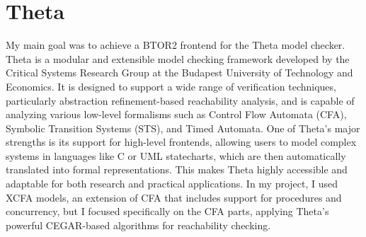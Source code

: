 \section{Theta}
My main goal was to achieve a BTOR2 frontend for the Theta model checker.
Theta is a modular and extensible model checking framework developed by the Critical Systems Research Group at the Budapest University of Technology and Economics. It is designed to support a wide range of verification techniques, particularly abstraction refinement-based reachability analysis, and is capable of analyzing various low-level formalisms such as Control Flow Automata (CFA), Symbolic Transition Systems (STS), and Timed Automata.
One of Theta's major strengths is its support for high-level frontends, allowing users to model complex systems in languages like C or UML statecharts, which are then automatically translated into formal representations. This makes Theta highly accessible and adaptable for both research and practical applications.
In my project, I used XCFA models, an extension of CFA that includes support for procedures and concurrency, but I focused specifically on the CFA parts, applying Theta's powerful CEGAR-based algorithms for reachability checking.
\cite{theta}